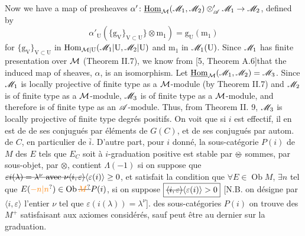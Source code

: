 Now we have a map of presheaves $\alpha'\colon \underline{\mathrm{Hom}}_{\mathcal{M}}(\mathscr{M}_1,\mathscr{M}_2)\otimes_{\mathscr{A}}^{\prime}\mathscr{M}_1\to \mathscr{M}_2$, defined by
\[
\alpha'_{\mathrm U}(\{\mathrm{g}_{\mathrm V}\}_{\mathrm V\subset\mathrm U}\}\otimes\mathrm{m}_1)=\mathrm{g}_{\mathrm U}(\mathrm{m}_1)
\]
for $\{\mathrm{g}_{\mathrm V}\}_{\mathrm V\subset\mathrm U}$ in $\mathrm{Hom}_{\mathcal{M}|\mathrm U}(\mathscr{M}_1|\mathrm U,\mathscr{M}_2|\mathrm U)$ and $\mathrm{m}_1$ in $\mathscr{M}_1(\mathrm U)$. Since $\mathscr{M}_1$ has finite presentation over $\mathcal{M}$ (Theorem II.7), we know from [5, Theorem A.6]that the induced map of sheaves, $\alpha$, is an isomorphism. Let $\underline{\mathrm{Hom}}_{\mathcal{M}}(\mathscr{M}_1,\mathscr{M}_2)=\mathscr{M}_3$. Since $\mathscr{M}_1$ is locally projective of finite type as a $\mathcal{M}$-module (by Theorem II.7) and $\mathscr{M}_2$ is of finite type as a $\mathcal{M}$-module, $\mathscr{M}_3$ is of finite type as a $\mathcal{M}$-module, and therefore is of finite type as an $\mathscr{A}$-module. Thus, from Theorem II. 9, $\mathscr{M}_3$ is locally projective of finite type
degrés positifs. On voit que si $i$ est effectif, il en est de  de ses conjugués par éléments de $G(C)$, et de ses conjugués par autom. de $C$, en particulier de $\bar i$. D'autre part, pour $i$ donné, la sous-catégorie  $P(i)$ de $M$  des $E$ tels que $E_C$ soit à $i$-graduation positive est  stable par $\deleted{\otimes}$ sommes, par  sous-objet, par $\otimes$, contient  $\Lambda(-1)$ si on suppose que $\deleted{\varepsilon i(\lambda)=\lambda^\nu\ \text{avec }\nu}\deleted{\langle i,\varepsilon\rangle}\inserted{\varepsilon(i)}\geq 0$, et satisfait la condition que $\forall E\in\operatorname{Ob}M$, $\exists n$ tel que $E(\unsure{-n|n})\in\operatorname{Ob}\deleted{\unsure{M}}P(i)$, si on suppose $\boxed{\deleted{\langle i,\varepsilon\rangle}\inserted{\varepsilon(i)}>0}$ [N.B. on désigne par $\langle i,\varepsilon\rangle$ l'entier $\nu$ tel que $\varepsilon(i(\lambda))=\lambda^\nu$].   des sous-catégories $P(i)$ on trouve des $M^+$ satisfaisant aux axiomes considérés, sauf peut être au dernier sur la graduation. 

